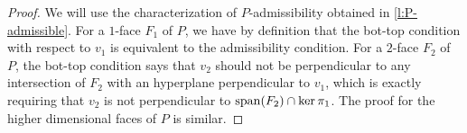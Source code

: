 \begin{proof}
	We will use the characterization of $P$-admissibility obtained in \cref{l:P-admissible}.
	For a $1$-face $F_1$ of $P$, we have by definition that the bot-top condition with respect to $v_1$ is equivalent to the admissibility condition.
	For a $2$-face $F_2$ of $P$, the bot-top condition says that $v_2$ should not be perpendicular to any intersection of $F_2$ with an hyperplane perpendicular to $v_1$, which is exactly requiring that $v_2$ is not perpendicular to $\operatorname{\mathrm{span}}(F_2)\cap \ker \pi_1$.
	The proof for the higher dimensional faces of $P$ is similar.
\end{proof}

